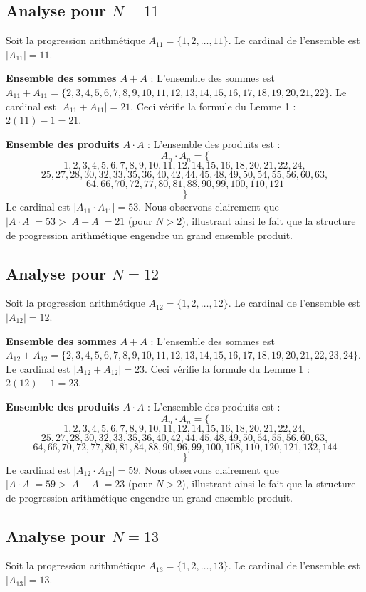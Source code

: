 \documentclass[11pt,a4paper]{article}
\begin{document}
\subsection{Analyse pour $N = 11$}
Soit la progression arithmétique $A_{11} = \{1, 2, \dots, 11\} $. Le cardinal de l'ensemble est $|A_{11}| = 11$.

\textbf{Ensemble des sommes $A+A$} :
L'ensemble des sommes est $A_{11} + A_{11} = \{2, 3, 4, 5, 6, 7, 8, 9, 10, 11, 12, 13, 14, 15, 16, 17, 18, 19, 20, 21, 22\} $. Le cardinal est $|A_{11} + A_{11}| = 21$. Ceci vérifie la formule du Lemme 1 : $2(11) - 1 = 21$.

\textbf{Ensemble des produits $A \cdot A$} :
L'ensemble des produits est :
$$ A_{{{n}}} \cdot A_{{{n}}} = \{ $$$$ 1, 2, 3, 4, 5, 6, 7, 8, 9, 10, 11, 12, 14, 15, 16, 18, 20, 21, 22, 24, $$$$ 25, 27, 28, 30, 32, 33, 35, 36, 40, 42, 44, 45, 48, 49, 50, 54, 55, 56, 60, 63, $$$$ 64, 66, 70, 72, 77, 80, 81, 88, 90, 99, 100, 110, 121 $$$$ \} $$
Le cardinal est $|A_{11} \cdot A_{11}| = 53$.
Nous observons clairement que $|A \cdot A| = 53 > |A+A| = 21$ (pour $N > 2$), illustrant ainsi le fait que la structure de progression arithmétique engendre un grand ensemble produit.
\newpage

\subsection{Analyse pour $N = 12$}
Soit la progression arithmétique $A_{12} = \{1, 2, \dots, 12\} $. Le cardinal de l'ensemble est $|A_{12}| = 12$.

\textbf{Ensemble des sommes $A+A$} :
L'ensemble des sommes est $A_{12} + A_{12} = \{2, 3, 4, 5, 6, 7, 8, 9, 10, 11, 12, 13, 14, 15, 16, 17, 18, 19, 20, 21, 22, 23, 24\} $. Le cardinal est $|A_{12} + A_{12}| = 23$. Ceci vérifie la formule du Lemme 1 : $2(12) - 1 = 23$.

\textbf{Ensemble des produits $A \cdot A$} :
L'ensemble des produits est :
$$ A_{{{n}}} \cdot A_{{{n}}} = \{ $$$$ 1, 2, 3, 4, 5, 6, 7, 8, 9, 10, 11, 12, 14, 15, 16, 18, 20, 21, 22, 24, $$$$ 25, 27, 28, 30, 32, 33, 35, 36, 40, 42, 44, 45, 48, 49, 50, 54, 55, 56, 60, 63, $$$$ 64, 66, 70, 72, 77, 80, 81, 84, 88, 90, 96, 99, 100, 108, 110, 120, 121, 132, 144 $$$$ \} $$
Le cardinal est $|A_{12} \cdot A_{12}| = 59$.
Nous observons clairement que $|A \cdot A| = 59 > |A+A| = 23$ (pour $N > 2$), illustrant ainsi le fait que la structure de progression arithmétique engendre un grand ensemble produit.
\newpage

\subsection{Analyse pour $N = 13$}
Soit la progression arithmétique $A_{13} = \{1, 2, \dots, 13\} $. Le cardinal de l'ensemble est $|A_{13}| = 13$.
\end{document}
